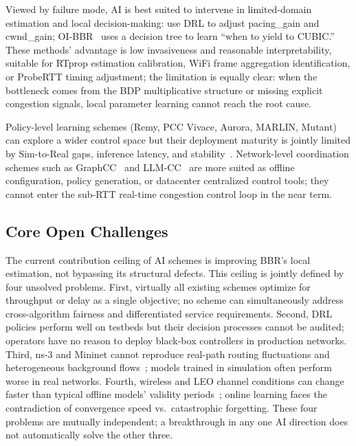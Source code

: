 \documentclass[a4paper,fleqn]{cas-sc}
\begin{document}
Viewed by failure mode, AI is best suited to intervene in limited-domain
estimation and local decision-making: \citet{ketabi2023drl} use DRL to adjust
pacing\_gain and cwnd\_gain; OI-BBR~\citep{kim2020ml} uses a decision tree to
learn ``when to yield to CUBIC.'' These methods' advantage is low invasiveness
and reasonable interpretability, suitable for RTprop estimation calibration, WiFi
frame aggregation identification, or ProbeRTT timing adjustment; the limitation is
equally clear: when the bottleneck comes from the BDP multiplicative structure or
missing explicit congestion signals, local parameter learning cannot reach the root
cause.

Policy-level learning schemes (Remy, PCC Vivace, Aurora, MARLIN, Mutant) can
explore a wider control space but their deployment maturity is jointly limited by
Sim-to-Real gaps, inference latency, and
stability~\citep{winstein2013remy,dong2018vivace,jay2019aurora,galliera2023marlin,pappone2025mutant}.
Network-level coordination schemes such as GraphCC~\citep{bernardez2025graphcc}
and LLM-CC~\citep{huang2024llm} are more suited as offline configuration, policy
generation, or datacenter centralized control tools; they cannot enter the
sub-RTT real-time congestion control loop in the near term.

\subsection{Core Open Challenges}
\label{sec:ai_challenges}

The current contribution ceiling of AI schemes is improving BBR's local
estimation, not bypassing its structural defects. This ceiling is jointly defined
by four unsolved problems. First, virtually all existing schemes optimize for
throughput or delay as a single objective; no scheme can simultaneously address
cross-algorithm fairness and differentiated service requirements. Second, DRL
policies perform well on testbeds but their decision processes cannot be audited;
operators have no reason to deploy black-box controllers in production networks.
Third, ns-3 and Mininet cannot reproduce real-path routing fluctuations and
heterogeneous background flows~\citep{jiang2021mlcc}; models trained in simulation
often perform worse in real networks. Fourth, wireless and LEO channel conditions
can change faster than typical offline models' validity periods~\citep{jiang2021mlcc,kamel2024starquic,laniewski2024road}; online learning faces the
contradiction of convergence speed vs.\ catastrophic forgetting. These four
problems are mutually independent; a breakthrough in any one AI direction does not
automatically solve the other three.
\end{document}
